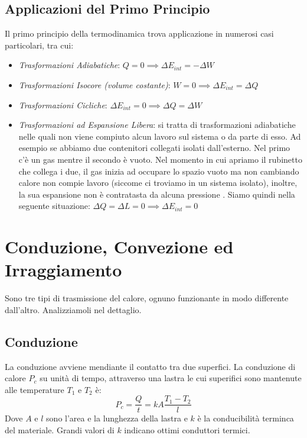         \subsection{Applicazioni del Primo Principio} Il primo principio della 
        termodinamica trova applicazione in numerosi casi particolari, tra cui:
            \begin{itemize}
                \item \textit{Trasformazioni Adiabatiche}: 
                    $Q=0 \implies \Delta E_{int} = -\Delta W$
                \item \textit{Trasformazioni Isocore (volume costante)}:
                    $W = 0 \implies \Delta E_{int} = \Delta Q$
                \item \textit{Trasformazioni Cicliche}:
                    $\Delta E_{int} = 0 \implies \Delta Q = \Delta W$
                \item \textit{Trasformazioni ad Espansione Libera}: si tratta 
                        di trasformazioni adiabatiche nelle quali non viene 
                        compiuto alcun lavoro sul sistema o da parte di esso.
                        Ad esempio se abbiamo due contenitori collegati isolati 
                        dall'esterno. Nel primo c'è un gas mentre il secondo è
                        vuoto. Nel momento in cui apriamo il rubinetto che 
                        collega i due, il gas inizia ad occupare lo spazio 
                        vuoto ma non cambiando calore non compie lavoro 
                        (siccome ci troviamo in un sistema isolato), inoltre,
                        la sua espansione non è contratasta da alcuna pressione
                        . Siamo quindi nella seguente situazione:
                        $\Delta Q = \Delta L = 0 \implies \Delta E_{int} = 0$
            \end{itemize}

        \section{Conduzione, Convezione ed Irraggiamento} Sono tre tipi di 
        trasmissione del calore, ognuno funzionante in modo differente 
        dall'altro. Analizziamoli nel dettaglio.

            \subsection{Conduzione} La conduzione avviene mendiante il contatto
            tra due superfici. La conduzione di calore $P_c$ su unità di tempo,
            attraverso una lastra le cui superifici sono mantenute alle 
            temperature $T_1$ e $T_2$ è:
                \begin{equation}
                    P_c = \frac{Q}{t} = kA\frac{T_1 - T_2}{l}
                \end{equation}
            Dove $A$ e $l$ sono l'area e la lunghezza della lastra e $k$ è la 
            conducibilità terminca del materiale. Grandi valori di $k$ indicano
            ottimi conduttori termici.

